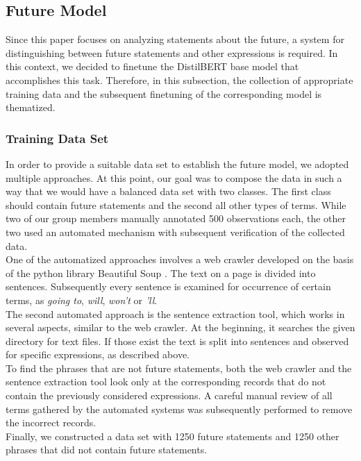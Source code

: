 \subsection{Future Model}
\label{future-model}
Since this paper focuses on analyzing statements about the future, a system for distinguishing between future statements and other expressions is required.
In this context, we decided to finetune the DistilBERT \citep{Sanh2019DistilBERTAD} base model that accomplishes this task.
Therefore, in this subsection, the collection of appropriate training data and the subsequent finetuning of the corresponding model is thematized.

\subsubsection{Training Data Set}
\label{training}
In order to provide a suitable data set to establish the future model, we adopted multiple approaches.
At this point, our goal was to compose the data in such a way that we would have a balanced data set with two classes.
The first class should contain future statements and the second all other types of terms.
While two of our group members manually annotated 500 observations each, the other two used an automated mechanism with subsequent verification of the collected data.
\\
One of the automatized approaches involves a web crawler developed on the basis of the python library Beautiful Soup \citep{Richardson2022}.
The text on a page is divided into sentences.
Subsequently every sentence is examined for occurrence of certain terms, as \emph{going to}, \emph{will}, \emph{won't} or \emph{'ll}.
\\
The second automated approach is the sentence extraction tool, which works in several aspects, similar to the web crawler.
At the beginning, it searches the given directory for text files.
If those exist the text is split into sentences and observed for specific expressions, as described above.
\\
To find the phrases that are not future statements, both the web crawler and the sentence extraction tool look only at the corresponding records that do not contain the previously considered expressions.
A careful manual review of all terms gathered by the automated systems was subsequently performed to remove the incorrect records.
\\
Finally, we constructed a data set with 1250 future statements and 1250 other phrases that did not contain future statements.

